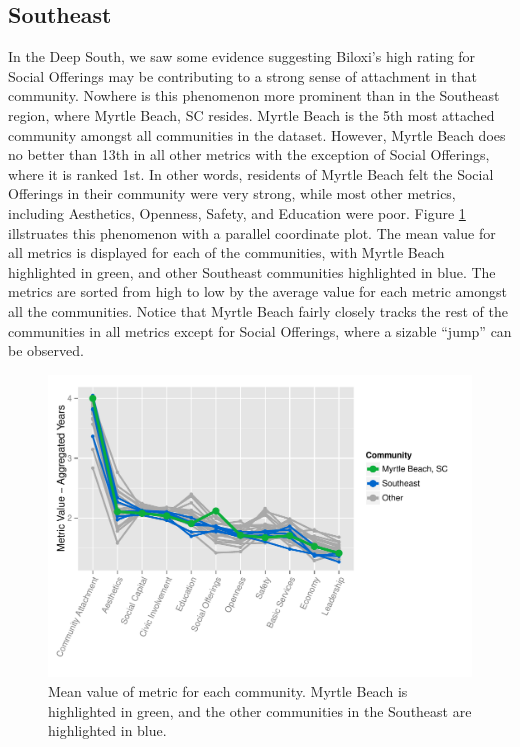 \documentclass[11pt]{article}\usepackage{knitr}
\begin{document}
\subsection*{Southeast}
In the Deep South, we saw some evidence suggesting Biloxi's high rating for Social Offerings may be contributing to a strong sense of attachment in that community. Nowhere is this phenomenon more prominent than in the Southeast region, where Myrtle Beach, SC resides. Myrtle Beach is the 5th most attached community amongst all communities in the dataset. However, Myrtle Beach does no better than 13th in all other metrics with the exception of Social Offerings, where it is ranked 1st. In other words, residents of Myrtle Beach felt the Social Offerings in their community were very strong, while most other metrics, including Aesthetics, Openness, Safety, and Education were poor. Figure \ref{fig:southeast_one} illstruates this phenomenon with a parallel coordinate plot. The mean value for all metrics is displayed for each of the communities, with Myrtle Beach highlighted in green, and other Southeast communities highlighted in blue. The metrics are sorted from high to low by the average value for each metric amongst all the communities. Notice that Myrtle Beach fairly closely tracks the rest of the communities in all metrics except for Social Offerings, where a sizable ``jump'' can be observed.

\begin{knitrout}
\color{fgcolor}\begin{figure}[H]


{\centering \includegraphics[width=\maxwidth]{figure/southeast_one} 

}

\caption[Mean value of metric for each community]{Mean value of metric for each community. Myrtle Beach is highlighted in green, and the other communities in the Southeast are highlighted in blue.\label{fig:southeast_one}}
\end{figure}


\end{knitrout}
\end{document}
